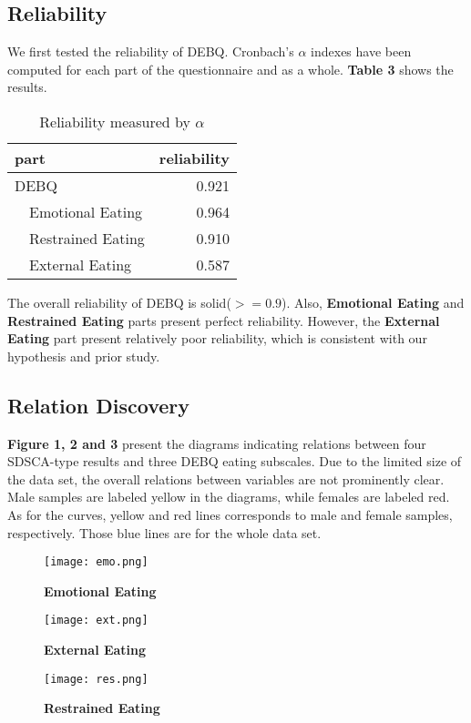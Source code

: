 \documentclass[letterpaper]{article}
\begin{document}
\subsection{Reliability}
We first tested the reliability of DEBQ. Cronbach's \(\alpha\) indexes have been computed for 
each part of the questionnaire and as a whole. \textbf{Table 3} shows the results.
\begin{table}[htbp]
    \caption{Reliability measured by \(\alpha\)}
    \centering
    \begin{tabular}{lr}
        \toprule
        part & reliability \\
        \midrule
        DEBQ & 0.921 \\
        ~~Emotional Eating & 0.964 \\
        ~~Restrained Eating & 0.910 \\
        ~~External Eating & 0.587 \\
        \bottomrule
    \end{tabular}
\end{table}
The overall reliability of DEBQ is solid(\(>= 0.9\)). Also, \textbf{Emotional Eating} and
\textbf{Restrained Eating} parts present perfect reliability. However, the \textbf{External Eating} part present
relatively poor reliability, which is consistent with our hypothesis and prior study.

\subsection{Relation Discovery}
\textbf{Figure 1, 2 and 3} present the diagrams indicating relations
between four SDSCA-type results and three DEBQ eating subscales. Due to the limited 
size of the data set, the overall relations between variables are not prominently clear.
Male samples are labeled yellow in the diagrams, while females are labeled red.
As for the curves, yellow and red lines corresponds to male and female samples, respectively.
Those blue lines are for the whole data set.
\begin{figure}[h]
    \caption{\textbf{Emotional Eating}}
    \centering
    \texttt{[image: emo.png]}
\end{figure}
\begin{figure}[h]
    \caption{\textbf{External Eating}}
    \centering
    \texttt{[image: ext.png]}
\end{figure}
\begin{figure}[h]
    \caption{\textbf{Restrained Eating}}
    \centering
    \texttt{[image: res.png]}
\end{figure}
\end{document}
